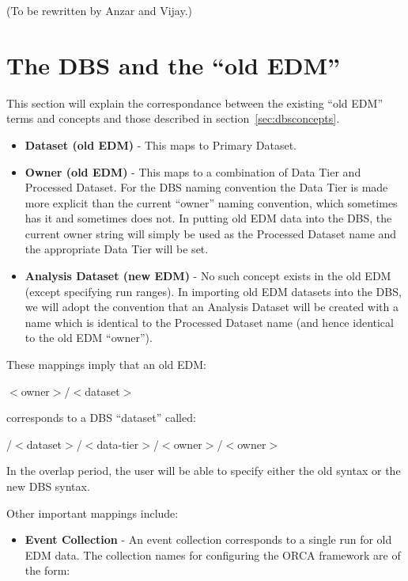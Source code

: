 \documentclass[pdftex]{cmspaper}
\begin{document}
{(To be rewritten by Anzar and Vijay.)

\section{The DBS and the ``old EDM''}

  This section will explain the correspondance between the existing ``old
EDM'' terms and concepts and those described in section~\ref{sec:dbsconcepts}.

\begin{itemize}
\item {\bf Dataset (old EDM)} - This maps to Primary Dataset.
\item {\bf Owner (old EDM)} - This maps to a combination of Data Tier and 
                        Processed
                        Dataset. For the DBS naming convention the Data Tier 
                        is made more explicit
                        than the current ``owner'' naming convention, which
                        sometimes has it and sometimes does not. In putting
                        old EDM data into the DBS, the current owner string
                        will simply be used as the Processed Dataset name
                        and the appropriate Data Tier will be set.
\item {\bf Analysis Dataset (new EDM)} - No such concept exists in the old EDM 
      (except specifying run ranges). In importing old EDM datasets into the 
      DBS, we will adopt the convention that an Analysis Dataset will be 
      created with a name which is identical to the Processed Dataset name 
      (and hence identical to the old EDM ``owner'').
\end{itemize}

  These mappings imply that an old EDM:
\begin{center}
          $<$owner$>$/$<$dataset$>$
\end{center}
corresponds to a DBS ``dataset'' called:
\begin{center}
          /$<$dataset$>$/$<$data-tier$>$/$<$owner$>$/$<$owner$>$
\end{center}

In the overlap period, the user will be able to specify either the old 
syntax or the new DBS syntax.

  Other important mappings include:

\begin{itemize}
\item {\bf Event Collection} - An event collection corresponds to a single run
                         for old EDM data. The collection names for 
                         configuring the ORCA framework are of the form:


\end{itemize}}
\end{document}
